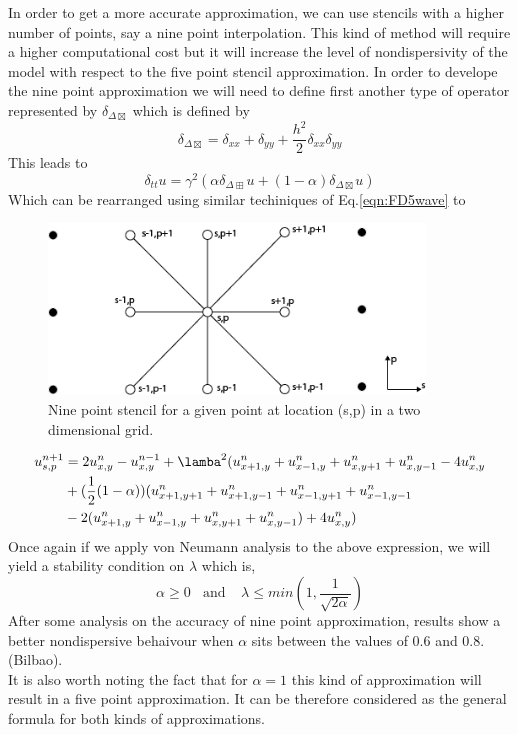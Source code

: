 In order to get a more accurate approximation, we can use stencils with a higher number of points, say a nine point interpolation. This kind of method will require a higher computational cost but it will increase the level of nondispersivity of the model with respect to the five point stencil approximation.
In order to develope the nine point approximation we will need to define first another type of operator represented by $\delta_{\Delta\boxtimes}$ which is defined by
\begin{equation}
	\delta_{\Delta\boxtimes}=\delta_{xx}+\delta_{yy} +\frac{h^2}{2}\delta_{xx}\delta_{yy}
\end{equation}
This leads to
\begin{equation}
	\delta_{tt}u=\gamma^{2}(\alpha\delta_{\Delta\boxplus} u + (1-\alpha)\delta_{\Delta\boxtimes}u)
\end {equation}
Which can be rearranged using similar techiniques of Eq.\ref{eqn:FD5wave} to
\begin{figure}[tb!]
\begin{center}
\includegraphics[width=10cm]{../Chapter_3/_Figs/9point.png}
\caption{Nine point stencil for a given point at location (s,p) in a two dimensional grid.}
\label{figs:9point}
\end{center}
\end{figure}
\begin{equation}
\label{eqn:FD9wave}
	\begin{align}
		u^{n+1}_{s,p}&=2u^{n}_{x,y}-u^{n-1}_{x,y}+\lamba^{2}(u^{n}_{x+1,y}+u^{n}_{x-1,y}+u^{n}_{x,y+1}+u^{n}_{x,y-1}-4u^{n}_{x,y}\\
				    &+(\frac{1}{2}(1-\alpha))(u^{n}_{x+1,y+1}+u^{n}_{x+1,y-1}+u^{n}_{x-1,y+1}+u^{n}_{x-1,y-1}\\
				    & -2(u^{n}_{x+1,y}+u^{n}_{x-1,y}+u^{n}_{x,y+1}+u^{n}_{x,y-1})+4u^{n}_{x,y} )
	\end{align}
\end{equation}
Once again if we apply von Neumann analysis to the above expression, we will yield a stability condition on $\lambda$ which is,
\begin{equation}
	\alpha \geq 0  \ \ \ \ \text{and} \ \ \ \ \    \lambda\leq min(1,\frac{1}{\sqrt{2\alpha}}) 
\end{equation}
After some analysis on the accuracy of nine point approximation, results show a better nondispersive behaivour when $\alpha$ sits between the values of 0.6 and 0.8.(Bilbao).\\
It is also worth noting the fact that for $\alpha=1$ this kind of approximation will result in a five point approximation. It can be therefore considered as the general formula for both kinds of approximations.\\

